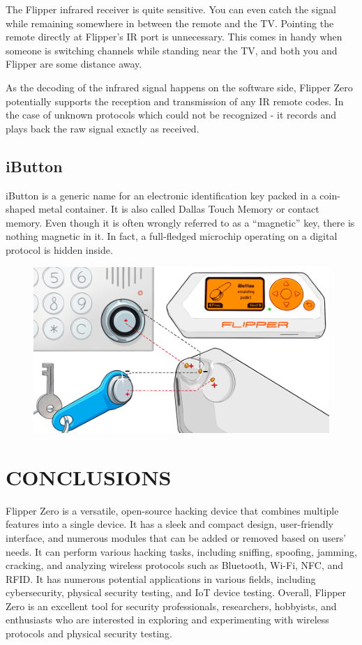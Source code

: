 \documentclass[a4paper,11pt]{report}
\begin{document}
The Flipper infrared receiver is quite sensitive. You can even catch the signal while remaining somewhere in between the remote and the TV. Pointing the remote directly at Flipper's IR port is unnecessary. This comes in handy when someone is switching channels while standing near the TV, and both you and Flipper are some distance away.

As the decoding of the infrared signal happens on the software side, Flipper Zero potentially supports the reception and transmission of any IR remote codes. In the case of unknown protocols which could not be recognized - it records and plays back the raw signal exactly as received.
\section{iButton}
iButton is a generic name for an electronic identification key packed in a coin-shaped metal container. It is also called Dallas Touch Memory or contact memory. Even though it is often wrongly referred to as a “magnetic” key, there is nothing magnetic in it. In fact, a full-fledged microchip operating on a digital protocol is hidden inside.
\begin{figure}[h]
  \centering
  \hspace{21pt}
  \includegraphics[width=.50\linewidth]{ibutton.png}
  \label{fig:type.png}
\end{figure}
\chapter{CONCLUSIONS}
Flipper Zero is a versatile, open-source hacking device that combines multiple features into a single device. It has a sleek and compact design, user-friendly interface, and numerous modules that can be added or removed based on users' needs. It can perform various hacking tasks, including sniffing, spoofing, jamming, cracking, and analyzing wireless protocols such as Bluetooth, Wi-Fi, NFC, and RFID. It has numerous potential applications in various fields, including cybersecurity, physical security testing, and IoT device testing. Overall, Flipper Zero is an excellent tool for security professionals, researchers, hobbyists, and enthusiasts who are interested in exploring and experimenting with wireless protocols and physical security testing.
\end{document}
